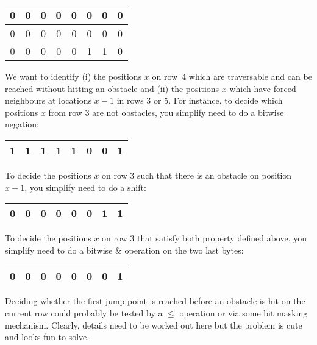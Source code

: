 \begin{center}
  \begin{tabular}{|c|c|c|c|c|c|c|c|}
    \hline
    0 & 0 & 0 & 0 & 0 & 0 & 0 & 0 \\
    \hline
    0 & 0 & 0 & 0 & 0 & 0 & 0 & 0 \\
    \hline
    0 & 0 & 0 & 0 & 0 & 1 & 1 & 0 \\
    \hline
  \end{tabular}
\end{center}

We want to identify (i) the positions $x$ on row~4 which are traversable and can
be reached without hitting an obstacle and (ii) the positions $x$ which have
forced neighbours at locations $x-1$ in rows $3$ or $5$.
For instance, to decide which positions $x$ from row 3 
are not obstacles, you simplify need to do a bitwise negation: 
\begin{center}
  \begin{tabular}{|c|c|c|c|c|c|c|c|}
    \hline
    1 & 1 & 1 & 1 & 1 & 0 & 0 & 1 \\
    \hline
  \end{tabular}
\end{center}
To decide the positions $x$ on row 3 
such that there is an obstacle on position $x-1$, 
you simplify need to do a shift: 
\begin{center}
  \begin{tabular}{|c|c|c|c|c|c|c|c|}
    \hline
    0 & 0 & 0 & 0 & 0 & 0 & 1 & 1 \\
    \hline
  \end{tabular}
\end{center}
To decide the positions $x$ on row 3 
that satisfy both property defined above, 
you simplify need to do a bitwise \& operation 
on the two last bytes: 
\begin{center}
  \begin{tabular}{|c|c|c|c|c|c|c|c|}
    \hline
    0 & 0 & 0 & 0 & 0 & 0 & 0 & 1 \\
    \hline
  \end{tabular}
\end{center}

Deciding whether the first jump point is  reached
before an obstacle is hit on the current row 
could probably be tested by a $\le$ operation or via
some bit masking mechanism.
Clearly, details need to be worked out here but the problem
is cute and looks fun to solve.
